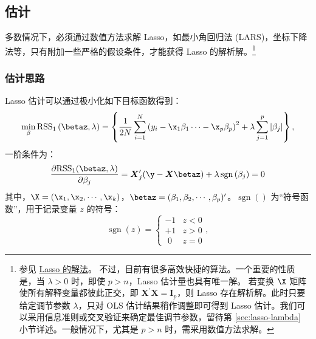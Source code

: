 




\subsection{估计}
多数情况下，必须通过数值方法求解 Lasso，如最小角回归法 (LARS)，坐标下降法等，只有附加一些严格的假设条件，才能获得 Lasso 的解析解。\footnote{%
   参见 \href{https://www.cnblogs.com/analysis101/p/14893843.html}{ Lasso 的解法}。
   不过，目前有很多高效快捷的算法。一个重要的性质是，当 $\lambda>0$ 时，即使 $p>n$，Lasso 估计量也具有唯一解。
   若变换 $\X$ 矩阵使所有解释变量都彼此正交，即 $\boldsymbol{X}^{\prime} \boldsymbol{X}=\boldsymbol{I}_{p}$，则 Lasso 存在解析解。此时只要给定调节参数 $\lambda$，只对 OLS 估计结果稍作调整即可得到 Lasso 估计。我们可以采用信息准则或交叉验证来确定最佳调节参数，留待第 \ref{sec:lasso-lambda} 小节详述。一般情况下，尤其是 $p>n$ 时，需采用数值方法求解。
}

\subsubsection{估计思路}
Lasso 估计可以通过极小化如下目标函数得到：
\begin{equation}\label{eq:lasso-HTW2015-2-5-B}
\underset{\beta}{\operatorname{min}}
\, \mathrm{RSS}_1\left(\betaz,\lambda\right) = 
\left\{\frac{1}{2 N}
\sum_{i=1}^{N}\left(y_i - \x_1\beta_1 \cdots - \x_p\beta_p \right)^2
   + \lambda \sum_{j=1}^{p}\left|\beta_{j}\right|\right\},
\end{equation}
一阶条件为：
\begin{equation}\label{eq:Lasso-foc-01}
\frac{\partial{\mathrm{RSS}_1(\betaz,\lambda)}}{\partial{\beta_j}} = 
\boldsymbol{X}_{j}^{\prime}(\y-\boldsymbol{X} \betaz)+\lambda \operatorname{sgn}\left(\beta_{j}\right)=0	
\end{equation}
其中，$\X = (\x_1,\x_2,\cdots,\x_k)$，$\betaz=(\beta_1,\beta_2,\cdots,\beta_p)'$。$\operatorname{sgn}()$ 为“符号函数”，用于记录变量 $z$ 的符号：
$$
    \operatorname{sgn}(z) =
    \begin{cases}
      -1 & z < 0\\
      +1 & z > 0\\
      \,\,0 & z = 0
    \end{cases},
$$

